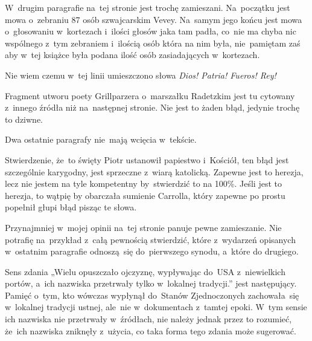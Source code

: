 \documentclass[a4paper,11pt]{article}
\begin{document}
\VerSpaceFour





\noindent
{} W~drugim paragrafie na~tej stronie jest trochę zamieszani.
Na~początku jest mowa o~zebraniu 87 osób szwajcarskim Vevey. Na~samym jego
końcu jest mowa o~głosowaniu w~kortezach i~ilości głosów jaka tam padła,
co~nie ma chyba nic wspólnego z~tym zebraniem i~ilością osób która na nim
była, nie~pamiętam zaś aby w~tej książce była podana ilość osób
zasiadających w~kortezach.

\VerSpaceFour





\noindent
{} Nie wiem czemu w~tej linii umieszczono słowa
\textit{Dios! Patria! Fueros! Rey!}

\VerSpaceFour





\noindent
{} Fragment utworu poety Grillparzera o~marszałku Radetzkim jest tu
cytowany z~innego źródła niż na~następnej stronie. Nie jest to żaden błąd,
jedynie trochę to dziwne.

\VerSpaceFour





\noindent
{} Dwa ostatnie paragrafy nie~mają wcięcia w~tekście.

\VerSpaceFour





\noindent
{} Stwierdzenie, że~to święty Piotr ustanowił papiestwo i~Kościół,
ten błąd jest szczególnie karygodny, jest sprzeczne z~wiarą katolicką.
Zapewne jest to herezja, lecz nie jestem na tyle kompetentny by~stwierdzić
to na 100\%. Jeśli jest to herezja, to wątpię by obarczała sumienie
Carrolla, który zapewne po prostu popełnił głupi błąd pisząc te słowa.

\VerSpaceFour





\noindent
{} Przynajmniej w~mojej opinii na~tej stronie panuje pewne
zamieszanie. Nie potrafię na~przykład z~całą pewnością
stwierdzić, które z~wydarzeń opisanych w~ostatnim paragrafie
odnoszą~się do~pierwszego synodu, a~które do drugiego.

\VerSpaceFour





\noindent
{} Sens zdania „Wielu opuszczało ojczyznę, wypływając
do~USA z~niewielkich portów, a~ich nazwiska przetrwały tylko w~lokalnej
tradycji.” jest następujący. Pamięć o~tym, kto wówczas wypłynął do~Stanów
Zjednoczonych zachowała~się w~lokalnej tradycji ustnej, ale~nie
w~dokumentach z~tamtej epoki. W~tym sensie ich nazwiska nie przetrwały
w~źródłach, nie należy jednak przez to rozumieć, że~ich nazwiska zniknęły
z~użycia, co taka forma tego zdania może sugerować.
\end{document}
